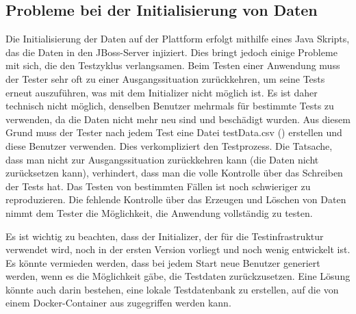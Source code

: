 \subsection{Probleme bei der Initialisierung von Daten}

Die Initialisierung der Daten auf der Plattform erfolgt mithilfe
eines Java Skripts, das die Daten in den JBoss-Server injiziert.
Dies bringt jedoch einige Probleme mit sich, die den Testzyklus
verlangsamen. Beim Testen einer Anwendung muss der Tester sehr
oft zu einer Ausgangssituation zurückkehren, um seine Tests erneut
auszuführen, was mit dem Initializer nicht möglich ist. Es ist daher
technisch nicht möglich, denselben Benutzer mehrmals für bestimmte
Tests zu verwenden, da die Daten nicht mehr neu sind und beschädigt
wurden. Aus diesem Grund muss der Tester nach jedem Test eine Datei
testData.csv () erstellen und diese Benutzer
verwenden. Dies verkompliziert den Testprozess. Die Tatsache, dass
man nicht zur Ausgangssituation zurückkehren kann (die Daten nicht
zurücksetzen kann), verhindert, dass man die volle Kontrolle über
das Schreiben der Tests hat. Das Testen von bestimmten Fällen ist
noch schwieriger zu reproduzieren. Die fehlende Kontrolle über das
Erzeugen und Löschen von Daten nimmt dem Tester die Möglichkeit,
die Anwendung vollständig zu testen.

Es ist wichtig zu beachten, dass der Initializer, der für die
Testinfrastruktur verwendet wird, noch in der ersten Version
vorliegt und noch wenig entwickelt ist. Es könnte vermieden werden,
dass bei jedem Start neue Benutzer generiert werden, wenn es die
Möglichkeit gäbe, die Testdaten zurückzusetzen. Eine Lösung könnte
auch darin bestehen, eine lokale Testdatenbank zu erstellen, auf die
von einem Docker-Container aus zugegriffen werden kann.
